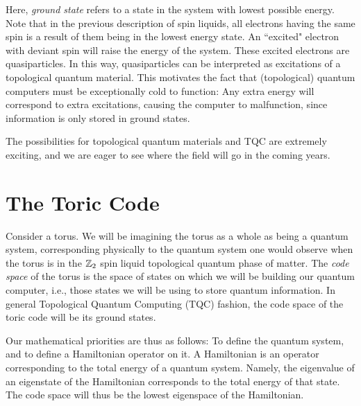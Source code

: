 \documentclass{article}
\theoremstyle{definition}
\numberwithin{figure}{section}
\begin{document}
Here, \textit{ground state} refers to a state in the system with lowest possible energy. Note that in the previous description of spin liquids, all electrons having the same spin is a result of them being in the lowest energy state. An ``excited" electron with deviant spin will raise the energy of the system. These excited electrons are quasiparticles. In this way, quasiparticles can be interpreted as excitations of a topological quantum material. This motivates the fact that (topological) quantum computers must be exceptionally cold to function: Any extra energy will correspond to extra excitations, causing the computer to malfunction, since information is only stored in ground states.

The possibilities for topological quantum materials and TQC are extremely exciting, and we are eager to see where the field will go in the coming years.

\section{The Toric Code}
\label{The Toric Code}

Consider a torus. We will be imagining the torus as a whole as being a quantum system, corresponding physically to the quantum system one would observe when the torus is in the $\mathbb{Z}_2$ spin liquid topological quantum phase of matter. The \textit{code space} of the torus is the space of states on which we will be building our quantum computer, i.e., those states we will be using to store quantum information. In general Topological Quantum Computing (TQC) fashion, the code space of the toric code will be its ground states.

Our mathematical priorities are thus as follows: To define the quantum system, and to define a Hamiltonian operator on it. A Hamiltonian is an operator corresponding to the total energy of a quantum system. Namely, the eigenvalue of an eigenstate of the Hamiltonian corresponds to the total energy of that state. The code space will thus be the lowest eigenspace of the Hamiltonian.
\end{document}

